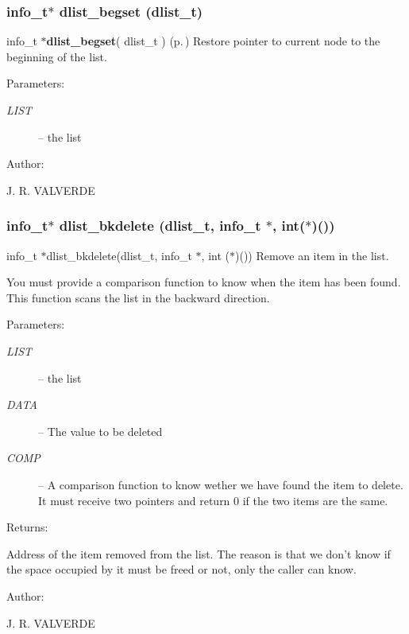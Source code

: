 \subsubsection{\setlength{\rightskip}{0pt plus 5cm}info\_\-t$\ast$ dlist\_\-begset ({\bf dlist\_\-t})}\label{P__dlist_8h_a15}


info\_\-t $\ast${\bf dlist\_\-begset}( dlist\_\-t ) {\rm (p.\,\pageref{P__dlist_8h_a15})} Restore pointer to current node to the beginning of the list.

\begin{Desc}
\item[Parameters: ]\par
\begin{description}
\item[{\em 
LIST}]-- the list\end{description}
\end{Desc}
\begin{Desc}
\item[Author: ]\par
J. R. VALVERDE \end{Desc}
\subsubsection{\setlength{\rightskip}{0pt plus 5cm}info\_\-t$\ast$ dlist\_\-bkdelete ({\bf dlist\_\-t}, info\_\-t $\ast$, int($\ast$)())}\label{P__dlist_8h_a22}


info\_\-t $\ast$dlist\_\-bkdelete(dlist\_\-t, info\_\-t $\ast$, int ($\ast$)()) Remove an item in the list.

You must provide a comparison function to know when the item has been found. This function scans the list in the backward direction.\begin{Desc}
\item[Parameters: ]\par
\begin{description}
\item[{\em 
LIST}]-- the list \item[{\em 
DATA}]-- The value to be deleted \item[{\em 
COMP}]-- A comparison function to know wether we have found the item to delete. It must receive two pointers and return 0 if the two items are the same.\end{description}
\end{Desc}
\begin{Desc}
\item[Returns: ]\par
Address of the item removed from the list. The reason is that we don't know if the space occupied by it must be freed or not, only the caller can know.\end{Desc}
\begin{Desc}
\item[Author: ]\par
J. R. VALVERDE \end{Desc}
